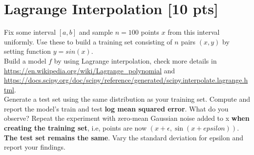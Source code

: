 \documentclass[a4paper]{article}
\theoremstyle{definition}
\begin{document}
\section{Lagrange Interpolation [10 pts]}
Fix some interval $[a, b]$ and sample $n = 100$ points $x$ from this interval uniformly. Use these to build a training set consisting of $n$ pairs $(x, y)$ by setting function $y = sin(x)$. \\

Build a model $f$ by using Lagrange interpolation, check more details in \url{https://en.wikipedia.org/wiki/Lagrange_polynomial} and \url{https://docs.scipy.org/doc/scipy/reference/generated/scipy.interpolate.lagrange.html}. \\

Generate a test set using the same distribution as your training set. Compute and report the model’s train and test \textbf{log mean squared error}. What do you observe? Repeat the experiment with zero-mean Gaussian noise added to x \textbf{when creating the training set}, i.e, points are now $(x + \epsilon, \sin(x + epsilon))$. \textbf{The test set remains the same}. Vary the standard deviation for epsilon and report your findings.
\end{document}
